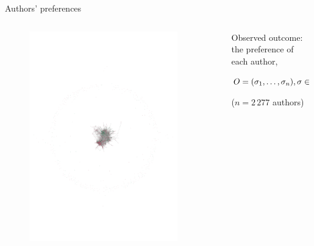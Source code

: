 \documentclass[10pt]{beamer}
\begin{document}
\begin{frame}{Authors' preferences}
\begin{columns}
    \begin{column}{0.65\textwidth}
        \vspace{-1em}
        \begin{figure}[!h]
        \centering\includegraphics[width=0.9\textwidth,trim=250 350 225 350,clip]{authors_network.pdf}
        \end{figure}
    \end{column}
    \begin{column}{0.35\textwidth}
        \centering
        Observed outcome: the preference of each author,

        \vspace{1em}
        
        $O=(\sigma_1,\dots,\sigma_n), \sigma \in \{\textcolor[HTML]{EE7993}{-1},\textcolor[HTML]{3FB17D}{+1}\}$

        \vspace{1em}

        ($n=2\,277$ authors)
    \end{column}
\end{columns}
\end{frame}
\end{document}

